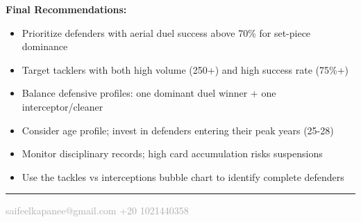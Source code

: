 \documentclass[12pt,a4paper]{article}
\begin{document}
\vspace{0.3cm}

\begin{tcolorbox}[colback=primary!10, colframe=primary, arc=5pt, boxrule=1.5pt]
\textcolor{primary}{\textbf{Final Recommendations:}}
\begin{itemize}
    \item Prioritize defenders with aerial duel success above 70\% for set-piece dominance
    \item Target tacklers with both high volume (250+) and high success rate (75\%+)
    \item Balance defensive profiles: one dominant duel winner + one interceptor/cleaner
    \item Consider age profile; invest in defenders entering their peak years (25-28)
    \item Monitor disciplinary records; high card accumulation risks suspensions
    \item Use the tackles vs interceptions bubble chart to identify complete defenders
\end{itemize}
\end{tcolorbox}

\vspace{0.5cm}

\begin{center}
\textcolor{primary}{\rule{0.7\textwidth}{0.5pt}}
\end{center}

\begin{center}
\textcolor{darkgray}{\small saifeelkapanee@gmail.com \hspace{0.5cm} +20 1021440358}
\end{center}
\end{document}
